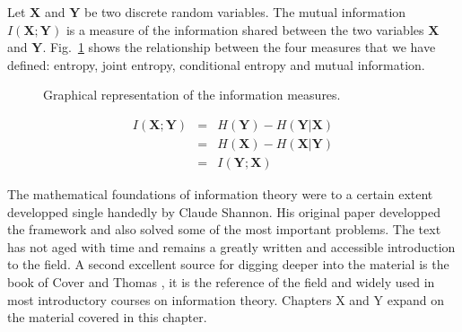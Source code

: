 Let $\mathbf{X}$ and $\mathbf{Y}$ be two discrete random variables. The mutual information $I(\mathbf{X};\mathbf{Y})$ is a measure of the information shared between the two variables $\mathbf{X}$ and $\mathbf{Y}$. Fig.~\ref{fig:infmeasures} shows the relationship between the four measures that we have defined: entropy, joint entropy, conditional entropy and mutual information.

\begin{figure}
\begin{center}
\def\svgwidth{.8\columnwidth} 
 
\caption{Graphical representation of the information measures.}
\label{fig:infmeasures}
\end{center}
\end{figure}

\begin{eqnarray}
\label{eq:mutualinformation}
I(\mathbf{X};\mathbf{Y}) &=& H(\mathbf{Y}) - H(\mathbf{Y}|\mathbf{X}) \nonumber\\
         &=& H(\mathbf{X}) - H(\mathbf{X}|\mathbf{Y}) \nonumber\\
         &=& I(\mathbf{Y};\mathbf{X})
\end{eqnarray}

The mathematical foundations of information theory were to a certain extent developped single handedly by Claude Shannon. His original paper \cite{} developped the framework and also solved some of the most important problems. The text has not aged with time and remains a greatly written and accessible introduction to the field. A second excellent source for digging deeper into the material is the book of Cover and Thomas \cite{}, it is the reference of the field and widely used in most introductory courses on information theory. Chapters X and Y expand on the material covered in this chapter.
